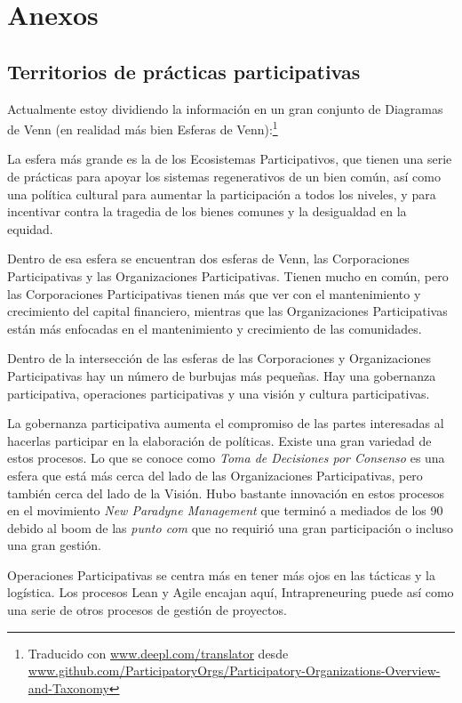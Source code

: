 \chapter{Anexos}
\label{cha:anexos}

\section{Territorios de prácticas participativas}
\label{sec:territorios}

Actualmente estoy dividiendo la información en un gran conjunto de Diagramas de Venn (en realidad más bien Esferas de Venn):\footnote{Traducido con \url{www.deepl.com/translator} desde \url{www.github.com/ParticipatoryOrgs/Participatory-Organizations-Overview-and-Taxonomy}}

La esfera más grande es la de los Ecosistemas Participativos, que tienen una serie de prácticas para apoyar los sistemas regenerativos de un bien común, así como una política cultural para aumentar la participación a todos los niveles, y para incentivar contra la tragedia de los bienes comunes y la desigualdad en la equidad.

Dentro de esa esfera se encuentran dos esferas de Venn, las Corporaciones Participativas y las Organizaciones Participativas. Tienen mucho en común, pero las Corporaciones Participativas tienen más que ver con el mantenimiento y crecimiento del capital financiero, mientras que las Organizaciones Participativas están más enfocadas en el mantenimiento y crecimiento de las comunidades.

Dentro de la intersección de las esferas de las Corporaciones y Organizaciones Participativas hay un número de burbujas más pequeñas. Hay una gobernanza participativa, operaciones participativas y una visión y cultura participativas.

La gobernanza participativa aumenta el compromiso de las partes interesadas al hacerlas participar en la elaboración de políticas. Existe una gran variedad de estos procesos. Lo que se conoce como \emph{Toma de Decisiones por Consenso} es una esfera que está más cerca del lado de las Organizaciones Participativas, pero también cerca del lado de la Visión. Hubo bastante innovación en estos procesos en el movimiento \emph{New Paradyne Management} que terminó a mediados de los 90 debido al boom de las \emph{punto com} que no requirió una gran participación o incluso una gran gestión.

Operaciones Participativas se centra más en tener más ojos en las tácticas y la logística. Los procesos Lean y Agile encajan aquí, Intrapreneuring puede así como una serie de otros procesos de gestión de proyectos.


